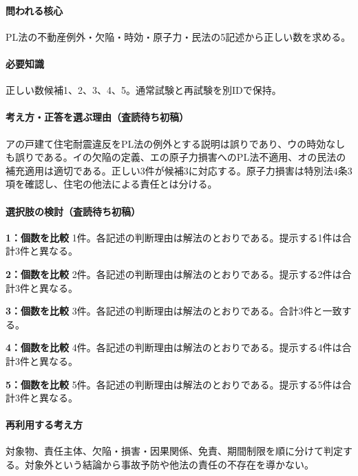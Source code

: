 \paragraph{問われる核心} PL法の不動産例外・欠陥・時効・原子力・民法の5記述から正しい数を求める。

\paragraph{必要知識} 正しい数候補1、2、3、4、5。通常試験と再試験を別IDで保持。

\paragraph{考え方・正答を選ぶ理由（査読待ち初稿）} アの戸建て住宅耐震違反をPL法の例外とする説明は誤りであり、ウの時効なしも誤りである。イの欠陥の定義、エの原子力損害へのPL法不適用、オの民法の補充適用は適切である。正しい3件が候補3に対応する。原子力損害は特別法4条3項を確認し、住宅の他法による責任とは分ける。

\paragraph{選択肢の検討（査読待ち初稿）}\mbox{}\par

\noindent\textbf{1：個数を比較} 1件。各記述の判断理由は解法のとおりである。提示する1件は合計3件と異なる。\par

\noindent\textbf{2：個数を比較} 2件。各記述の判断理由は解法のとおりである。提示する2件は合計3件と異なる。\par

\noindent\textbf{3：個数を比較} 3件。各記述の判断理由は解法のとおりである。合計3件と一致する。\par

\noindent\textbf{4：個数を比較} 4件。各記述の判断理由は解法のとおりである。提示する4件は合計3件と異なる。\par

\noindent\textbf{5：個数を比較} 5件。各記述の判断理由は解法のとおりである。提示する5件は合計3件と異なる。\par

\paragraph{再利用する考え方} 対象物、責任主体、欠陥・損害・因果関係、免責、期間制限を順に分けて判定する。対象外という結論から事故予防や他法の責任の不存在を導かない。

